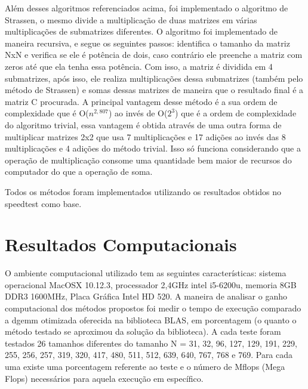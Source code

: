 \documentclass[a4paper, 10pt]{article}
\begin{document}
Além desses algoritmos referenciados  acima, foi implementado o algoritmo de Strassen, o mesmo divide a multiplicação de duas matrizes em várias multiplicações de submatrizes diferentes. O algoritmo foi implementado de maneira recursiva, e segue os seguintes passos: identifica o tamanho da matriz NxN e verifica se ele é potência de dois, caso contrário ele preenche a matriz com zeros até que ela tenha essa potência. Com isso, a matriz é dividida em 4 submatrizes, após isso, ele realiza multiplicações dessa submatrizes (também pelo método de Strassen) e somas dessas matrizes de maneira que o resultado final é a matriz C procurada. A principal vantagem desse método é a sua ordem de complexidade que é O($n^{2,807}$) ao invés de O($2^{3}$) que é a ordem de complexidade do algoritmo trivial, essa vantagem é obtida através de uma outra forma de multiplicar matrizes 2x2 que usa 7 multiplicações e 17 adições ao invés das 8 multiplicações e 4 adições do método trivial. Isso só funciona considerando que a operação de multiplicação consome uma quantidade bem maior de recursos do computador do que a operação de soma.

Todos os métodos foram implementados utilizando os resultados obtidos no speedtest como base.

\newpage
\section{Resultados Computacionais}
O ambiente computacional utilizado tem as seguintes características: sistema operacional MacOSX 10.12.3, processador 2,4GHz intel i5-6200u, memoria 8GB DDR3 1600MHz, Placa Gráfica Intel HD 520. A maneira de analisar o ganho computacional dos métodos propostos foi medir o tempo de execução comparado a dgemm otimizada oferecida na biblioteca BLAS, em porcentagem (o quanto o método testado se aproximou da solução da biblioteca). A cada teste foram testados 26 tamanhos diferentes do tamanho N = 31, 32, 96, 127, 129, 191, 229, 255, 256, 257, 319, 320, 417, 480, 511, 512, 639, 640, 767, 768 e 769. Para cada uma existe uma porcentagem referente ao teste e o número de Mflops (Mega Flops) necessários para aquela execução em específico. 
\end{document}
